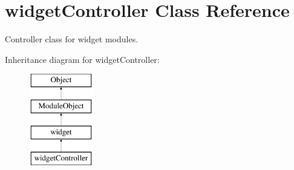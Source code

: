 \hypertarget{classwidgetController}{\section{widget\-Controller Class Reference}
\label{classwidgetController}
}


Controller class for widget modules.  


Inheritance diagram for widget\-Controller\-:\begin{figure}[H]
\begin{center}
\leavevmode
\includegraphics[height=4.000000cm]{classwidgetController}
\end{center}
\end{figure}
